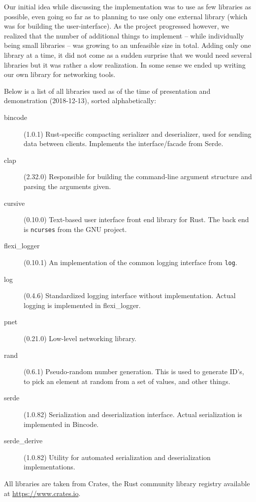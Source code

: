 \documentclass[12pt, a4paper]{article}
\begin{document}

Our initial idea while discussing the implementation was to use as few libraries as possible, even going so far as to planning to use only one external library (which was for building the user-interface). As the project progressed however, we realized that the number of additional things to implement -- while individually being small libraries -- was growing to an unfeasible size in total. Adding only one library at a time, it did not come as a sudden surprise that we would need several libraries but it was rather a slow realization. In some sense we ended up writing our own library for networking tools.

Below is a list of all libraries used as of the time of presentation and demonstration (2018-12-13), sorted alphabetically:

\begin{description}
\item [bincode] (1.0.1) Rust-specific compacting serializer and deserializer, used for sending data between clients. Implements the interface/facade from Serde.
\item [clap] (2.32.0) Responsible for building the command-line argument structure and parsing the arguments given.
\item [cursive] (0.10.0) Text-based user interface front end library for Rust. The back end is \texttt{ncurses} from the GNU project.
\item [flexi\_logger] (0.10.1) An implementation of the common logging interface from \texttt{log}.
\item [log] (0.4.6) Standardized logging interface without implementation. Actual logging is implemented in flexi\_logger.
\item [pnet] (0.21.0) Low-level networking library.
\item [rand] (0.6.1) Pseudo-random number generation. This is used to generate ID's, to pick an element at random from a set of values, and other things.
\item [serde] (1.0.82) Serialization and deserialization interface. Actual serialization is implemented in Bincode.
\item [serde\_derive] (1.0.82) Utility for automated serialization and deserialization implementations.
\end{description}

All libraries are taken from Crates, the Rust community library registry available at \url{https://www.crates.io}.
\end{document}
